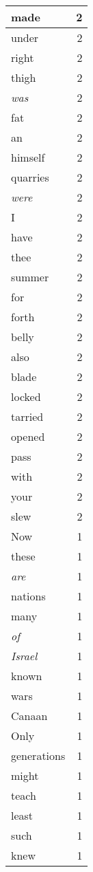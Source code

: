 \begin{center}
\begin{longtable}{l|r}
made & 2 \\ \hline
under & 2 \\ \hline
right & 2 \\ \hline
thigh & 2 \\ \hline
\emph{was} & 2 \\ \hline
fat & 2 \\ \hline
an & 2 \\ \hline
himself & 2 \\ \hline
quarries & 2 \\ \hline
\emph{were} & 2 \\ \hline
I & 2 \\ \hline
have & 2 \\ \hline
thee & 2 \\ \hline
summer & 2 \\ \hline
for & 2 \\ \hline
forth & 2 \\ \hline
belly & 2 \\ \hline
also & 2 \\ \hline
blade & 2 \\ \hline
locked & 2 \\ \hline
tarried & 2 \\ \hline
opened & 2 \\ \hline
pass & 2 \\ \hline
with & 2 \\ \hline
your & 2 \\ \hline
slew & 2 \\ \hline
Now & 1 \\ \hline
these & 1 \\ \hline
\emph{are} & 1 \\ \hline
nations & 1 \\ \hline
many & 1 \\ \hline
\emph{of} & 1 \\ \hline
\emph{Israel} & 1 \\ \hline
known & 1 \\ \hline
wars & 1 \\ \hline
Canaan & 1 \\ \hline
Only & 1 \\ \hline
generations & 1 \\ \hline
might & 1 \\ \hline
teach & 1 \\ \hline
least & 1 \\ \hline
such & 1 \\ \hline
knew & 1 \\ \hline

\end{longtable}
\end{center}
